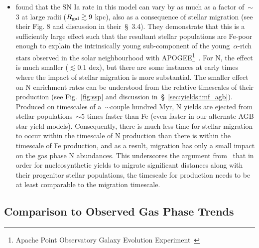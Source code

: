 \documentclass[ms.tex]{subfiles}
\begin{document}
\begin{itemize}
	\item \citet{Johnson2021} found that the SN Ia rate in this model can vary 
	by as much as a factor of~$\sim$3 at large radii ($R_\text{gal}\gtrsim 9$ kpc), 
	also as a consequence of stellar migration (see their Fig. 8 and discussion 
	in their~\S~3.4). 
	They demonstrate that this is a sufficiently large effect such that the 
	resultant stellar populations are Fe-poor enough to explain the 
	intrinsically young sub-component of the young~$\alpha$-rich stars observed 
	in the solar neighbourhood with APOGEE\footnote{
		Apache Point Observatory Galaxy Evolution 
		Experiment~\citep{Majewski2017} 
	}~\citep[see discussion in their~\S\S~3.2 and 3.4;][]{Chiappini2015, 
	Martig2015, Martig2016, Jofre2016, Yong2016, Izzard2018, SilvaAguirre2018, 
	Warfield2021}. 
	For N, the effect is much smaller ($\lesssim 0.1$ dex), but there are some 
	instances at early times where the impact of stellar migration is more 
	substantial. 
	The smaller effect on N enrichment rates can be understood from the 
	relative timescales of their production (see Fig.~\ref{fig:ssp} and 
	discussion in~\S~\ref{sec:yields:imf_agb}). 
	Produced on timescales of a~$\sim$couple hundred Myr, N yields are ejected 
	from stellar populations~$\sim$5 times faster than Fe (even faster in our 
	alternate AGB star yield models). 
	Consequently, there is much less time for stellar migration to occur within 
	the timescale of N production than there is within the timescale of Fe 
	production, and as a result, migration has only a small impact on the gas 
	phase N abundances. 
	This underscores the argument from~\citet{Johnson2021} that in order for 
	nucleosynthetic yields to migrate significant distances along with their 
	progenitor stellar populations, the timescale for production needs to be 
	at least comparable to the migration timescale. 

\end{itemize} 

\subsection{Comparison to Observed Gas Phase Trends} 
\label{sec:results:yields} 
\end{document}
